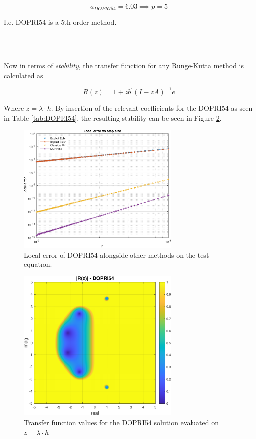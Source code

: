 \begin{equation*}
    a_{DOPRI54} = 6.03 \implies p = 5 
\end{equation*}

I.e. DOPRI54 is a 5th order method.

\\\

Now in terms of \textit{stability}, the transfer function for any Runge-Kutta method is calculated as 

\begin{equation}
R(z)=1+z b^{\prime}(I-z A)^{-1} e
\end{equation}

Where $z = \lambda \cdot h$. By insertion of the relevant coefficients for the DOPRI54 as seen in Table \ref{tab:DOPRI54}, the resulting stability can be seen in Figure \ref{fig:6_3c}.

\begin{figure}[h]
    \centering
    \includegraphics[width=0.7\textwidth]{plots/6_3b.pdf}
    \caption{Local error of DOPRI54 alongside other methods on the test equation.}
    \label{fig:6_3b}
\end{figure}

\begin{figure}[h]
    \centering
    \includegraphics[width=0.7\textwidth]{plots/6_3c.pdf}
    \caption{Transfer function values for the DOPRI54 solution evaluated on $z = \lambda \cdot h$}
    \label{fig:6_3c}
\end{figure}

